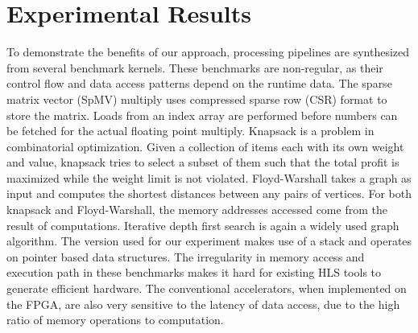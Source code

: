 \section{Experimental Results}
\label{sec:er}
To demonstrate the benefits of our approach, processing pipelines
are synthesized from several benchmark kernels. These benchmarks
are non-regular, as their control flow and data access patterns 
depend on the runtime data. The sparse matrix vector (SpMV) multiply uses
compressed sparse row (CSR) format to store the matrix. 
Loads from
an index array are performed before numbers can be fetched
for the actual floating point multiply. 
Knapsack is a problem in combinatorial optimization. Given a collection of
items each with its own weight and value, knapsack tries to select a subset of them such that the total profit
is maximized while the weight limit is not violated.
Floyd-Warshall takes a graph as input and computes the shortest distances between any pairs
of vertices. For both knapsack and Floyd-Warshall, the memory addresses accessed come from the result
of computations. Iterative depth first search is again a widely used graph algorithm. The version used for our experiment
 makes use of a stack and operates on pointer based data structures. 
The irregularity in
memory access and execution path in these benchmarks makes it hard for existing
HLS tools to generate efficient hardware. The conventional accelerators, when
implemented on the FPGA, are also very sensitive to the latency
of data access, due to the high ratio of memory operations to computation.


